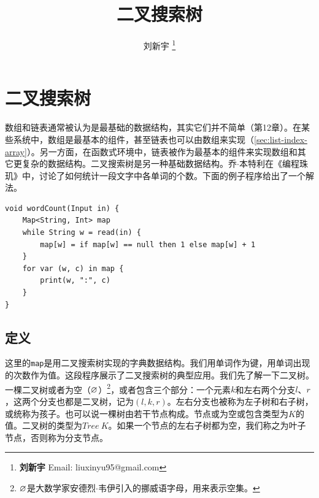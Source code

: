 \documentclass[b5paper]{ctexart}
\begin{document}
\title{二叉搜索树}

\author{刘新宇
\thanks{{\bfseries 刘新宇} \newline
  Email: liuxinyu95@gmail.com \newline}
  }

\maketitle
\fi


\ifx\wholebook\relax
\chapter{二叉搜索树}
\fi

数组和链表通常被认为是最基础的数据结构，其实它们并不简单（第12章）。在某些系统中，数组是最基本的组件，甚至链表也可以由数组来实现（\cref{sec:list-index-array}）。另一方面，在函数式环境中，链表被作为最基本的组件来实现数组和其它更复杂的数据结构。二叉搜索树是另一种基础数据结构。乔$\cdot$本特利在《编程珠玑》\cite{Bentley}中，讨论了如何统计一段文字中各单词的个数。下面的例子程序给出了一个解法。

\lstset{frame=single}
\begin{lstlisting}[language=Bourbaki]
void wordCount(Input in) {
    Map<String, Int> map
    while String w = read(in) {
        map[w] = if map[w] == null then 1 else map[w] + 1
    }
    for var (w, c) in map {
        print(w, ":", c)
    }
}
\end{lstlisting}



\section{定义}
\label{introduction} 

这里的\texttt{map}是用二叉搜索树实现的字典数据结构。我们用单词作为键，用单词出现的次数作为值。这段程序展示了二叉搜索树的典型应用。我们先了解一下二叉树。一棵二叉树或者为空（$\varnothing$）\footnote{$\varnothing$是大数学家安德烈$\cdot$韦伊引入的挪威语字母，用来表示空集。}，或者包含三个部分：一个元素$k$和左右两个分支$l$、$r$，这两个分支也都是二叉树，记为$(l, k, r)$。左右分支也被称为左子树和右子树，或统称为孩子。也可以说一棵树由若干节点构成。节点或为空或包含类型为$K$的值。二叉树的类型为$Tree\ K$。如果一个节点的左右子树都为空，我们称之为叶子节点，否则称为分支节点。
\end{document}
